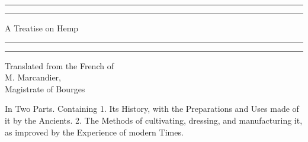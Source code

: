 \documentclass[a4paper, 11pt, oneside, polutonikogreek, english]{article}
\begin{document}
\begin{titlepage} %
	\centering %
	\scshape %

	
	\rule{\textwidth}{1.6pt}\vspace*{-\baselineskip}\vspace*{2pt} %
	\rule{\textwidth}{0.4pt} %
	
	\vspace{0.75\baselineskip} %

        {\LARGE A Treatise on Hemp \\} %
	
	\vspace{0.75\baselineskip} %
	
	\rule{\textwidth}{0.4pt}\vspace*{-\baselineskip}\vspace{3.2pt} %
	\rule{\textwidth}{1.6pt} %
	
	\vspace{1\baselineskip} %
	
	
	{Translated from the French of \\\Large M. Marcandier, \\\normalsize Magistrate of Bourges\\} %
	
	\vspace*{1\baselineskip} %
	
	
	\vspace{1\baselineskip} %

        {\small In Two Parts. Containing 1. Its History, with the Preparations and Uses made of it by the Ancients. 2. The Methods of cultivating, dressing, and manufacturing it, as improved by the Experience of modern Times.}


\end{titlepage}
\end{document}
